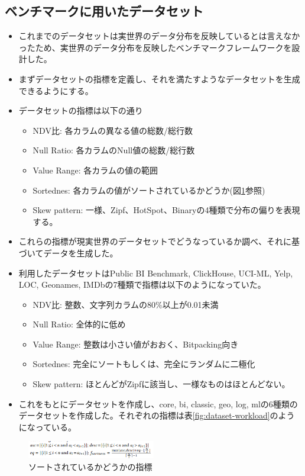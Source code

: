 \documentclass[uplatex]{jsarticle}
\theoremstyle{remark}
\begin{document}
\subsection{ベンチマークに用いたデータセット}
\begin{itemize}
  \item これまでのデータセットは実世界のデータ分布を反映しているとは言えなかったため、実世界のデータ分布を反映したベンチマークフレームワークを設計した。
  \item まずデータセットの指標を定義し、それを満たすようなデータセットを生成できるようにする。
  \item データセットの指標は以下の通り
  \begin{itemize}
    \item NDV比: 各カラムの異なる値の総数/総行数
    \item Null Ratio: 各カラムのNull値の総数/総行数
    \item Value Range: 各カラムの値の範囲
    \item Sortednes: 各カラムの値がソートされているかどうか(図\ref{fig:sortedness}参照)
    \item Skew pattern: 一様、Zipf、HotSpot、Binaryの4種類で分布の偏りを表現する。
  \end{itemize}
  \item これらの指標が現実世界のデータセットでどうなっているか調べ、それに基づいてデータを生成した。
  \item 利用したデータセットはPublic BI Benchmark, ClickHouse, UCI-ML, Yelp, LOC, Geonames, IMDbの7種類で指標は以下のようになっていた。
  \begin{itemize}
    \item NDV比: 整数、文字列カラムの80\%以上が0.01未満
    \item Null Ratio: 全体的に低め
    \item Value Range: 整数は小さい値がおおく、Bitpacking向き
    \item Sortednes: 完全にソートもしくは、完全にランダムに二極化
    \item Skew pattern: ほとんどがZipfに該当し、一様なものはほとんどない。
  \end{itemize}
  \item これをもとにデータセットを作成し、core, bi, classic, geo, log, mlの6種類のデータセットを作成した。それぞれの指標は表\ref{fig:dataset-workload}のようになっている。
\end{itemize}

\begin{figure}
  \centering
  \includegraphics[width=0.5\textwidth]{img/columnar_storage_format/sortedness.png}
  \caption{ソートされているかどうかの指標}
  \label{fig:sortedness}
\end{figure}
\end{document}
